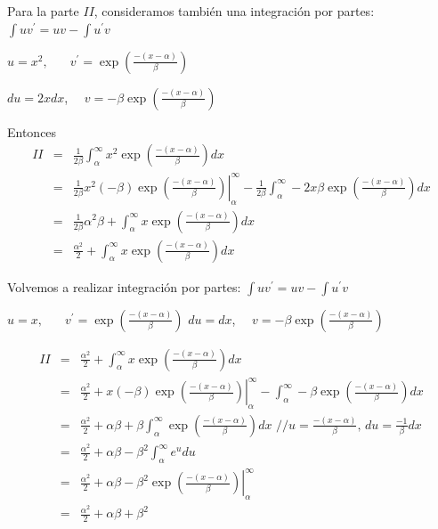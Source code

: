 \begin{i}
\bigskip

Para la parte $II$, consideramos también una integración por partes: 
$\int uv^{\prime }=uv-\int u^{\prime }v$

$u=x^{2},$ \ $\ \ \ \ v^{\prime }=\exp \left( \frac{-(x-\alpha )}{\beta }\right)$

$du=2xdx$, \ \ $v=-\beta \exp \left( \frac{-(x-\alpha )}{\beta }\right) $

Entonces
\begin{eqnarray*}
II &=&\frac{1}{2\beta }\int_{\alpha }^{\infty }x^{2}\exp \left( \frac{
-(x-\alpha )}{\beta }\right) dx \\
&=&\left. \frac{1}{2\beta }x^{2}(-\beta )\exp \left( \frac{-(x-\alpha )}{
\beta }\right) \right\vert _{\alpha }^{\infty }-\frac{1}{2\beta }
\int_{\alpha }^{\infty }-2x\beta \exp \left( \frac{-(x-\alpha )}{\beta }
\right) dx \\
&=&\frac{1}{2\beta }\alpha ^{2}\beta +\int_{\alpha }^{\infty }x\exp \left( 
\frac{-(x-\alpha )}{\beta }\right) dx\text{ \ \ } \\
&=&\frac{\alpha ^{2}}{2}+\int_{\alpha }^{\infty }x\exp \left( \frac{
-(x-\alpha )}{\beta }\right) dx\text{ \ \ }
\end{eqnarray*}

Volvemos a realizar integración por partes: $\int uv^{\prime }=uv-\int u^{\prime }v$

$u=x,$ \ $\ \ \ \ v^{\prime }=\exp \left( \frac{-(x-\alpha )}{\beta }\right) $
$du=dx$, \ \ $v=-\beta \exp \left( \frac{-(x-\alpha )}{\beta }\right) $

\begin{eqnarray*}
II &=&\frac{\alpha ^{2}}{2}+\int_{\alpha }^{\infty }x\exp \left( \frac{
-(x-\alpha )}{\beta }\right) dx\text{ \ \ } \\
&=&\frac{\alpha ^{2}}{2}+\left. x(-\beta )\exp \left( \frac{-(x-\alpha )}{
\beta }\right) \right\vert _{\alpha }^{\infty }-\int_{\alpha }^{\infty
}-\beta \exp \left( \frac{-(x-\alpha )}{\beta }\right) dx \\
&=&\frac{\alpha ^{2}}{2}+\alpha \beta +\beta \int_{\alpha }^{\infty }\exp
\left( \frac{-(x-\alpha )}{\beta }\right) dx\text{ \ \ \ //}u=\frac{
-(x-\alpha )}{\beta }\text{, \ }du=\frac{-1}{\beta }dx \\
&=&\frac{\alpha ^{2}}{2}+\alpha \beta -\beta ^{2}\int_{\alpha }^{\infty
}e^{u}du \\
&=&\frac{\alpha ^{2}}{2}+\alpha \beta -\beta ^{2}\left. \exp \left( \frac{
-(x-\alpha )}{\beta }\right) \right\vert _{\alpha }^{\infty } \\
&=&\frac{\alpha ^{2}}{2}+\alpha \beta +\beta ^{2}
\end{eqnarray*}


\end{i}
